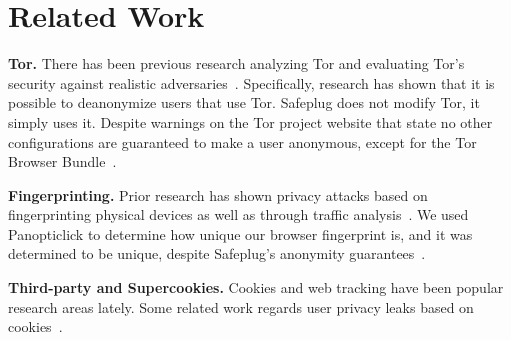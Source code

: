 \section{Related Work}
\label{sec:related}

{\bf Tor.} There has been previous research analyzing Tor and evaluating Tor's security against realistic adversaries~\cite{tor2}.  Specifically, research has shown that it is possible to deanonymize users that use Tor.  Safeplug does not modify Tor, it simply uses it.  Despite warnings on the Tor project website that state no other configurations are guaranteed to make a user anonymous, except for the Tor Browser Bundle~\cite{torproject}.

{\bf Fingerprinting.}  Prior research has shown privacy attacks based on fingerprinting physical devices as well as through traffic analysis~\cite{fingerprint1, fingerprint2}.  We used Panopticlick to determine how unique our browser fingerprint is, and it was determined to be unique, despite Safeplug's anonymity guarantees~\cite{pano}.

{\bf Third-party and Supercookies.} Cookies and web tracking have been popular research areas lately.  Some related work regards user privacy leaks based on cookies~\cite{commercial1, commercial2}.
